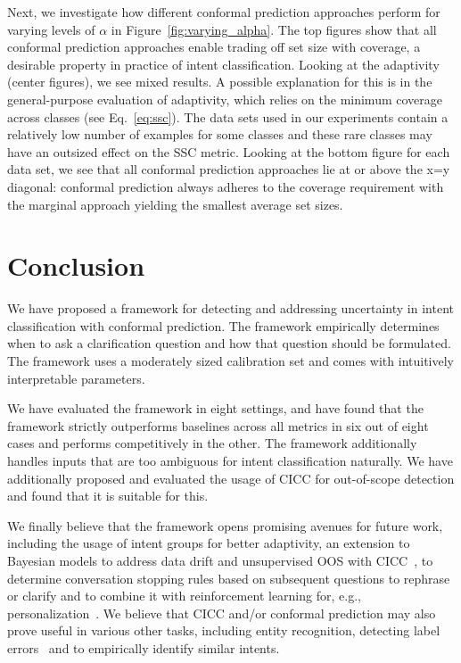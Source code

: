 \documentclass[11pt]{article}
\begin{document}
Next, we investigate how different conformal prediction approaches perform for varying levels of $\alpha$ in Figure~\ref{fig:varying_alpha}. The top figures show that all conformal prediction approaches enable trading off set size with coverage, a desirable property in practice of intent classification. Looking at the adaptivity (center figures), we see mixed results. A possible explanation for this is in the general-purpose evaluation of adaptivity, which relies on the minimum coverage across classes (see Eq.~\ref{eq:ssc}). The data sets used in our experiments contain a relatively low number of examples for some classes and these rare classes may have an outsized effect on the SSC metric. Looking at the bottom figure for each data set, we see that all conformal prediction approaches lie at or above the x=y diagonal: conformal prediction always adheres to the coverage requirement with the marginal approach yielding the smallest average set sizes. 


\section{Conclusion}
We have proposed a framework for detecting and addressing uncertainty in intent classification with conformal prediction. The framework empirically determines when to ask a clarification question and how that question should be formulated. The framework uses a moderately sized calibration set and comes with intuitively interpretable parameters.

We have evaluated the framework in eight settings, and have found that the framework strictly outperforms baselines across all metrics in six out of eight cases and performs competitively in the other. The framework additionally handles inputs that are too ambiguous for intent classification naturally. We have additionally proposed and evaluated the usage of CICC for out-of-scope detection and found that it is suitable for this.

We finally believe that the framework opens promising avenues for future work, including the usage of intent groups for better adaptivity, an extension to Bayesian models to address data drift and unsupervised OOS with CICC~\citep{fong2021conformal}, to determine conversation stopping rules based on subsequent questions to rephrase or clarify and to combine it with reinforcement learning for, e.g., personalization~\citep{den2019reinforcement,den2020reinforcement}. We believe that CICC and/or conformal prediction may also prove useful in various other tasks, including entity recognition, detecting label errors~\citep{ying2022label} and to empirically identify similar intents.
\end{document}
